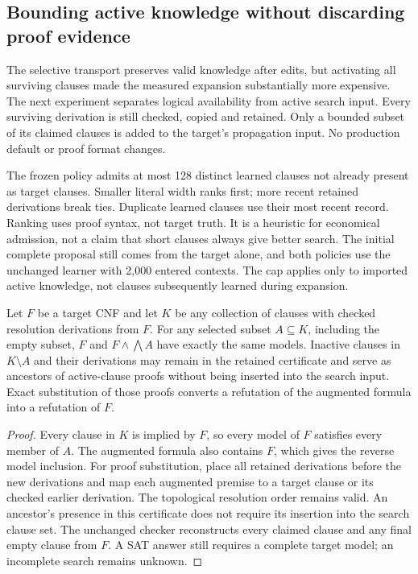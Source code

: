 \subsection{Bounding active knowledge without discarding proof evidence}
\label{sec:admitted-learning}

The selective transport preserves valid knowledge after edits, but activating
all surviving clauses made the measured expansion substantially more expensive.
The next experiment separates logical availability from active search input.
Every surviving derivation is still checked, copied and retained.  Only a bounded
subset of its claimed clauses is added to the target's propagation input.
No production default or proof format changes.

The frozen policy admits at most 128 distinct learned clauses not already
present as target clauses.  Smaller literal width ranks first; more recent
retained derivations break ties.  Duplicate learned clauses use their most
recent record.  Ranking uses proof syntax, not target truth.  It is a heuristic
for economical admission, not a claim that short clauses always give better
search.  The initial complete proposal still comes from the target alone,
and both policies use the unchanged learner with 2,000 entered contexts.
The cap applies only to imported active knowledge, not clauses subsequently
learned during expansion.

\begin{proposition}
Let $F$ be a target CNF and let $K$ be any collection of clauses with checked
resolution derivations from $F$.  For any selected subset $A\subseteq K$,
including the empty subset, $F$ and $F\land\bigwedge A$ have exactly the same
models.  Inactive clauses in $K\setminus A$ and their derivations may remain in
the retained certificate and serve as ancestors of active-clause proofs without
being inserted into the search input.  Exact substitution of those proofs
converts a refutation of the augmented formula into a refutation of $F$.
\end{proposition}
\begin{proof}
Every clause in $K$ is implied by $F$, so every model of $F$ satisfies every
member of $A$.  The augmented formula also contains $F$, which gives the reverse
model inclusion.  For proof substitution, place all retained derivations before
the new derivations and map each augmented premise to a target clause or its
checked earlier derivation.  The topological resolution order remains valid.
An ancestor's presence in this certificate does not require its insertion into
the search clause set.  The unchanged checker reconstructs every claimed clause
and any final empty clause from $F$.  A SAT answer still requires a complete
target model; an incomplete search remains unknown.
\end{proof}

